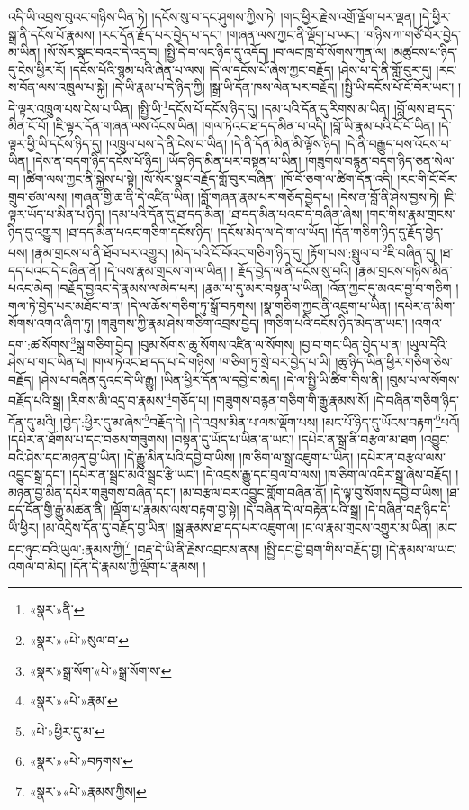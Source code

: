 འདི་ཡི་འབྲས་བུའང་གཉིས་ཡིན་ཏེ། །དངོས་སུ་བ་དང་ཤུགས་ཀྱིས་ཏེ། །གང་ཕྱིར་རྗེས་འགྲོ་ལྡོག་པར་ལྡན། །དེ་ཕྱིར་སྒྲ་ནི་དངོས་པོ་རྣམས། །རང་དོན་རྗོད་པར་བྱེད་པ་དང་། །གཞན་ལས་ཀྱང་ནི་ལྡོག་པ་ཡང་། །གཉིས་ཀ་གཙོ་བོར་བྱེད་མ་ཡིན། །སོ་སོར་སྣང་བའང་དེ་འདྲ་བ། །སྤྱི་དེ་བ་ལང་ཉིད་དུ་འདོད། །བ་ལང་ཁྲ་བོ་སོགས་ཀུན་ལ། །མཚུངས་པ་ཉིད་དུ་ངེས་ཕྱིར་རོ། །དངོས་པོའི་སྙམ་པའི་ཞེན་པ་ལས། །དེ་ལ་དངོས་པོ་ཞེས་ཀྱང་བརྗོད། །ཤེས་པ་དེ་ནི་གློ་བུར་དུ། །རང་ས་བོན་ལས་འཁྲུལ་པ་སྐྱེ། །དེ་ཡི་རྣམ་པ་དེ་ཉིད་ཀྱི། །སྒྲ་ཡི་དོན་ཁས་ལེན་པར་བརྗོད། །སྤྱི་ཡི་དངོས་པོ་ངོ་བོར་ཡང་། །དེ་ལྟར་འཁྲུལ་པས་ངེས་པ་ཡིན། །སྤྱི་ཡི་\footnote{«སྣར་»ནི་}དངོས་པོ་དངོས་ཉིད་དུ། །དམ་པའི་དོན་དུ་རིགས་མ་ཡིན། །བློ་ལས་ཐ་དད་མིན་ངོ་བོ། །ཇི་ལྟར་དོན་གཞན་ལས་འོངས་ཡིན། །གལ་ཏེའང་ཐ་དད་མིན་པ་འདི། །བློ་ཡི་རྣམ་པའི་ངོ་བོ་ཡིན། །དེ་ལྟར་ཕྱི་ཡི་དངོས་ཉིད་དུ། །འཁྲུལ་པས་དེ་ནི་ངེས་བ་ཡིན། །དེ་ནི་དོན་མིན་མི་ལྟོས་ཉིད། །དེ་ནི་བརྒྱུད་པས་འོངས་པ་ཡིན། །དེས་ན་བདག་ཉིད་དངོས་པོ་ཉིད། །ཡོད་ཉིད་མིན་པར་བསྟན་པ་ཡིན། །གཟུགས་བརྙན་བདག་ཉིད་ཅན་སེལ་བ། །ཚིག་ལས་ཀྱང་ནི་སྐྱེས་པ་སྟེ། །སོ་སོར་སྣང་བརྗོད་གློ་བུར་བཞིན། །ཁོ་བོ་ཅག་ལ་ཚིག་དོན་འདི། །རང་གི་ངོ་བོར་གྲུབ་ཙམ་ལས། །གཞན་གྱི་ཆ་ནི་དེ་འཛིན་ཡིན། །བློ་གཞན་རྣམ་པར་གཅོད་བྱེད་པ། །དེས་ན་བློ་ནི་ཤེས་བྱས་ཏེ། །ཇི་ལྟར་ཡོད་པ་མིན་པ་ཉིད། །དམ་པའི་དོན་དུ་ཐ་དད་མིན། །ཐ་དད་མིན་པའང་དེ་བཞིན་ཞེས། །གང་གིས་རྣམ་གྲངས་ཉིད་དུ་འགྱུར། །ཐ་དད་མིན་པའང་གཅིག་དངོས་ཉིད། །དངོས་མེད་ལ་དེ་ག་ལ་ཡོད། །དོན་གཅིག་ཉིད་དུ་རྗོད་བྱེད་པས། །རྣམ་གྲངས་པ་ནི་ཐོབ་པར་འགྱུར། །མེད་པའི་ངོ་བོའང་གཅིག་ཉིད་དུ། །རྟོག་པས་:སྤྲུལ་བ་\footnote{«སྣར་»«པེ་»སུལ་བ་}ཇི་བཞིན་དུ། །ཐ་དད་པའང་དེ་བཞིན་ནོ། །དེ་ལས་རྣམ་གྲངས་ག་ལ་ཡིན། །
རྗོད་བྱེད་ལ་ནི་དངོས་སུ་བའི། །རྣམ་གྲངས་གཉིས་མིན་པའང་མེད། །བརྗོད་བྱའང་དེ་རྣམས་ལ་མེད་པར། །རྣམ་པ་དུ་མར་བསྟན་པ་ཡིན། །འོན་ཀྱང་དུ་མའང་བྱ་བ་གཅིག །གལ་ཏེ་བྱེད་པར་མཐོང་བ་ན། །དེ་ལ་ཆོས་གཅིག་ཏུ་སྒྲོ་བཏགས། །སྣ་གཅིག་ཀྱང་ནི་འཇུག་པ་ཡིན། །དཔེར་ན་མིག་སོགས་འགའ་ཞིག་ཏུ། །གཟུགས་ཀྱི་རྣམ་ཤེས་གཅིག་འབྲས་བྱེད། །གཅིག་པའི་དངོས་ཉིད་མེད་ན་ཡང་། །འགའ་དག་:ཚ་སོགས་\footnote{«སྣར་»སྒྲ་སོག་«པེ་»སྒྲ་སོག་ས་}སྒྲ་གཅིག་བྱེད། །བུམ་སོགས་ཆུ་སོགས་འཛིན་ལ་སོགས། །བྱ་བ་གང་ཡིན་བྱེད་པ་ན། །ཡུལ་དེའི་ཤེས་པ་གང་ཡིན་པ། །གལ་ཏེའང་ཐ་དད་པ་དེ་གཉིས། །གཅིག་ཏུ་སྲེ་བར་བྱེད་པ་ཡི། །ཆུ་ཉིད་ཡིན་ཕྱིར་གཅིག་ཅེས་བརྗོད། །ཤེས་པ་བཞིན་དུའང་དེ་ཡི་རྒྱུ། །ཡིན་ཕྱིར་དོན་ལ་དབྱེ་བ་མེད། །དེ་ལ་སྤྱི་ཡི་ཚིག་གིས་ནི། །བུམ་པ་ལ་སོགས་བརྗོད་པའི་སྒྲ། །རིགས་མི་འདྲ་བ་རྣམས་\footnote{«སྣར་»«པེ་»རྣམ་}གཅོད་པ། །གཟུགས་བརྙན་གཅིག་གི་རྒྱུ་རྣམས་སོ། །དེ་བཞིན་གཅིག་ཉིད་དོན་དུ་མའི། །བྱེད་:ཕྱིར་དུ་མ་ཞེས་\footnote{«པེ་»ཕྱིར་དུ་མ་}བརྗོད་དེ། །དེ་འབྲས་མིན་པ་ལས་ལྡོག་པས། །མང་པོ་ཉིད་དུ་ཡོངས་བརྟག་\footnote{«སྣར་»«པེ་»བཏགས་}པའོ། །དཔེར་ན་ཐོགས་པ་དང་བཅས་གཟུགས། །བསྟན་དུ་ཡོད་པ་ཡིན་ན་ཡང་། །དཔེར་ན་སྒྲ་ནི་བརྩལ་མ་ཐག །འབྱུང་བའི་ཤེས་དང་མཉན་བྱ་ཡིན། །དེ་རྒྱུ་མིན་པའི་དབྱེ་བ་ཡིས། །ཁ་ཅིག་ལ་སྒྲ་འཇུག་པ་ཡིན། །དཔེར་ན་བརྩལ་ལས་འབྱུང་སྒྲ་དང་། །དཔེར་ན་སྦྲང་མའི་སྦྲང་རྩི་ཡང་། །དེ་འབྲས་རྒྱུ་དང་བྲལ་བ་ལས། །ཁ་ཅིག་ལ་འདིར་སྒྲ་ཞེས་བརྗོད། །མཉན་བྱ་མིན་དཔེར་གཟུགས་བཞིན་དང་། །མ་བརྩལ་བར་འབྱུང་གློག་བཞིན་ནོ། །དེ་ལྟ་བུ་སོགས་དབྱེ་བ་ཡིས། །ཐ་དད་དོན་གྱི་རྒྱུ་མཚན་ནི། །ལྡོག་པ་རྣམས་ལས་བརྟག་བྱ་སྟེ། །དེ་བཞིན་དེ་ལ་བརྟེན་པའི་སྒྲ། །དེ་བཞིན་བརྡ་ཉིད་དེ་ཡི་ཕྱིར། །མ་འདྲེས་དོན་དུ་བརྗོད་བྱ་ཡིན། །སྒྲ་རྣམས་ཐ་དད་པར་འཇུག་ལ། །ང་ལ་རྣམ་གྲངས་འགྱུར་མ་ཡིན། །མང་དང་ཉུང་བའི་ཡུལ་:རྣམས་ཀྱི།\footnote{«སྣར་»«པེ་»རྣམས་ཀྱིས།} །བརྡ་དེ་ཡི་ནི་རྗེས་འབྲངས་ནས། །སྤྱི་དང་བྱེ་བྲག་གིས་བརྗོད་བྱ། །དེ་རྣམས་ལ་ཡང་འགལ་བ་མེད། །དོན་དེ་རྣམས་ཀྱི་ལྡོག་པ་རྣམས། །
